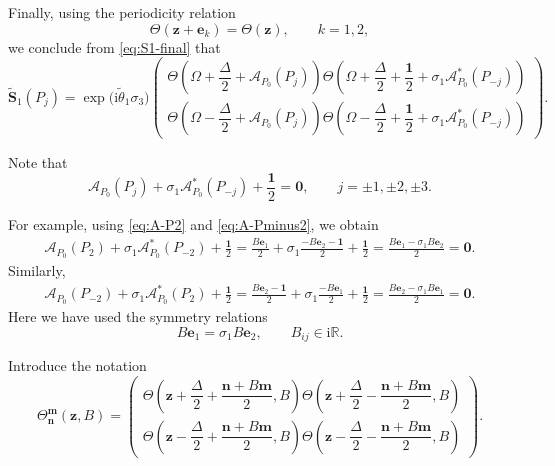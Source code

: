 \documentclass{amsart}
\numberwithin{equation}{hw}
\begin{document}
Finally, using the periodicity relation
\[
\Theta(\bm{z}+\bm{e}_k)
=
\Theta(\bm{z}),
\qquad
k=1,2,
\]
we conclude from \eqref{eq:S1-final} that
\begin{equation}
\widetilde{\bm{S}}_1(P_j)
=
\exp\!\bigl(
\mathrm{i}\widetilde{\theta}_1\sigma_3
\bigr)
\begin{pmatrix}
\Theta\!\left(
\Omega+\dfrac{\Delta}{2}
+\mathcal{A}_{P_0}(P_j)
\right)
\Theta\!\left(
\Omega+\dfrac{\Delta}{2}
+\dfrac{\bm{1}}{2}
+\sigma_1\mathcal{A}_{P_0}^*(P_{-j})
\right)
\\[12pt]
\Theta\!\left(
\Omega-\dfrac{\Delta}{2}
+\mathcal{A}_{P_0}(P_j)
\right)
\Theta\!\left(
\Omega-\dfrac{\Delta}{2}
+\dfrac{\bm{1}}{2}
+\sigma_1\mathcal{A}_{P_0}^*(P_{-j})
\right)
\end{pmatrix}.
\label{eq:S1-shifted}
\end{equation}

Note that
\begin{equation}
\mathcal{A}_{P_0}(P_j)
+
\sigma_1\mathcal{A}_{P_0}^*(P_{-j})
+
\frac{\bm{1}}{2}
=
\bm{0},
\qquad
j=\pm1,\pm2,\pm3.
\label{eq:Abel-identity}
\end{equation}

For example, using \eqref{eq:A-P2} and \eqref{eq:A-Pminus2}, we obtain
\begin{align}
\mathcal{A}_{P_0}(P_2)
+
\sigma_1\mathcal{A}_{P_0}^*(P_{-2})
+
\frac{\bm{1}}{2}
=
\frac{B\bm{e}_1}{2}
+
\sigma_1
\frac{-B\bm{e}_2-\bm{1}}{2}
+
\frac{\bm{1}}{2}
=
\frac{
B\bm{e}_1
-
\sigma_1B\bm{e}_2
}{
2
}
=
\bm{0}.
\label{eq:Abel-identity-P2}
\end{align}
Similarly,
\begin{align}
\mathcal{A}_{P_0}(P_{-2})
+
\sigma_1\mathcal{A}_{P_0}^*(P_2)
+
\frac{\bm{1}}{2}
=
\frac{B\bm{e}_2-\bm{1}}{2}
+
\sigma_1
\frac{-B\bm{e}_1}{2}
+
\frac{\bm{1}}{2}
=
\frac{
B\bm{e}_2
-
\sigma_1B\bm{e}_1
}{
2
}
=
\bm{0}.
\label{eq:Abel-identity-Pminus2}
\end{align}
Here we have used the symmetry relations
\begin{equation}
B\bm{e}_1
=
\sigma_1B\bm{e}_2,
\qquad
B_{ij}\in\mathrm{i}\mathbb{R}.
\label{eq:B-symmetry}
\end{equation}

Introduce the notation
\begin{equation}
\Theta_{\bm{n}}^{\bm{m}}(\bm{z},B)
=
\begin{pmatrix}
\Theta\!\left(
\bm{z}
+\dfrac{\Delta}{2}
+\dfrac{\bm{n}+B\bm{m}}{2},
B
\right)
\Theta\!\left(
\bm{z}
+\dfrac{\Delta}{2}
-\dfrac{\bm{n}+B\bm{m}}{2},
B
\right)
\\[12pt]
\Theta\!\left(
\bm{z}
-\dfrac{\Delta}{2}
+\dfrac{\bm{n}+B\bm{m}}{2},
B
\right)
\Theta\!\left(
\bm{z}
-\dfrac{\Delta}{2}
-\dfrac{\bm{n}+B\bm{m}}{2},
B
\right)
\end{pmatrix}.
\label{eq:ThetaNM-definition}
\end{equation}
\end{document}
